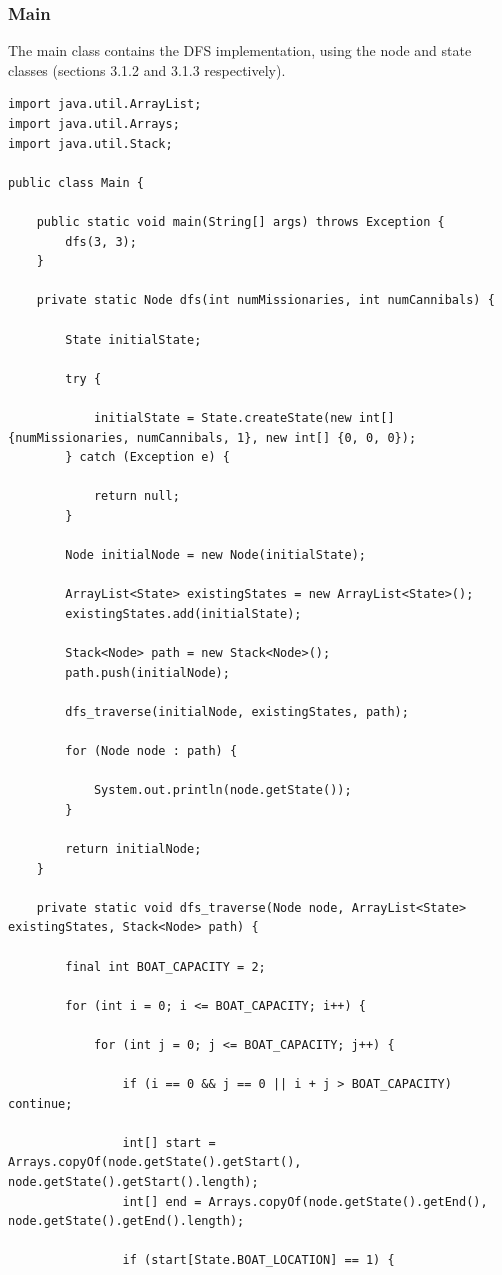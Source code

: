 \documentclass[11pt]{article}
\begin{document}
\subsubsection{Main}
The main class contains the DFS implementation, using the node and state classes (sections 3.1.2 and 3.1.3 respectively).
\begin{lstlisting}
import java.util.ArrayList;
import java.util.Arrays;
import java.util.Stack;

public class Main {

	public static void main(String[] args) throws Exception {		
		dfs(3, 3);
	}
	
	private static Node dfs(int numMissionaries, int numCannibals) {
		
		State initialState;
		
		try {
			
			initialState = State.createState(new int[] {numMissionaries, numCannibals, 1}, new int[] {0, 0, 0});
		} catch (Exception e) {
			
			return null;
		}
		
		Node initialNode = new Node(initialState);
		
		ArrayList<State> existingStates = new ArrayList<State>();
		existingStates.add(initialState);
		
		Stack<Node> path = new Stack<Node>();
		path.push(initialNode);
				
		dfs_traverse(initialNode, existingStates, path);
		
		for (Node node : path) {
			
			System.out.println(node.getState());
		}
		
		return initialNode;
	}
	
	private static void dfs_traverse(Node node, ArrayList<State> existingStates, Stack<Node> path) {
		
		final int BOAT_CAPACITY = 2;
		
		for (int i = 0; i <= BOAT_CAPACITY; i++) {
						
			for (int j = 0; j <= BOAT_CAPACITY; j++) {
				
				if (i == 0 && j == 0 || i + j > BOAT_CAPACITY) continue;
				
				int[] start = Arrays.copyOf(node.getState().getStart(), node.getState().getStart().length);
				int[] end = Arrays.copyOf(node.getState().getEnd(), node.getState().getEnd().length);
				
				if (start[State.BOAT_LOCATION] == 1) {
					

\end{lstlisting}
\end{document}
